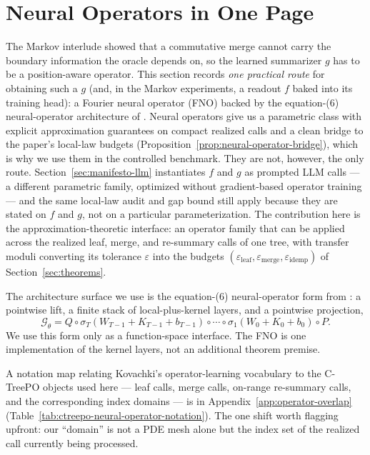 \section{Neural Operators in One Page}\label{sec:fno-primer}

The Markov interlude showed that a commutative merge cannot carry the
boundary information the oracle depends on, so the learned summarizer
$g$ has to be a position-aware operator. This section records \emph{one
practical route} for obtaining such a $g$ (and, in the Markov
experiments, a readout $f$ baked into its training head): a Fourier
neural operator (FNO) backed by the equation-(6) neural-operator
architecture of \citet{Kovachki23NeuralOperator}. Neural operators give
us a parametric class with explicit approximation guarantees on compact
realized calls and a clean bridge to the paper's local-law budgets
(Proposition~\ref{prop:neural-operator-bridge}), which is why we use
them in the controlled benchmark. They are not, however, the only
route. Section~\ref{sec:manifesto-llm} instantiates $f$ and $g$ as
prompted LLM calls --- a different parametric family, optimized without
gradient-based operator training --- and the same local-law audit and
gap bound still apply because they are stated on $f$ and $g$, not on a
particular parameterization. The contribution here is the approximation-theoretic interface: an
operator family that can be applied across the realized leaf, merge,
and re-summary calls of one tree, with transfer moduli converting its
tolerance $\varepsilon$ into the budgets
$(\varepsilon_{\mathrm{leaf}}, \varepsilon_{\mathrm{merge}},
\varepsilon_{\mathrm{idemp}})$ of Section~\ref{sec:theorems}.

The architecture surface we use is the equation-(6) neural-operator form
from \citet{Kovachki23NeuralOperator}: a pointwise lift, a finite stack
of local-plus-kernel layers, and a pointwise projection,
\begin{equation}\label{eq:equation6-no}
\mathcal{G}_{\theta}
  =
  Q \circ
  \sigma_T(W_{T-1}+K_{T-1}+b_{T-1})
  \circ \cdots \circ
  \sigma_1(W_0+K_0+b_0)
  \circ P .
\end{equation}
We use this form only as a function-space interface. The FNO is one
implementation of the kernel layers, not an additional theorem premise.

A notation map relating Kovachki's operator-learning vocabulary to the
C-TreePO objects used here --- leaf calls, merge calls, on-range
re-summary calls, and the corresponding index domains --- is in
Appendix~\ref{app:operator-overlap} (Table~\ref{tab:ctreepo-neural-operator-notation}).
The one shift worth flagging upfront: our ``domain'' is not a PDE mesh
alone but the index set of the realized call currently being processed.

